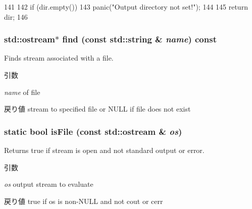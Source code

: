 \begin{DoxyCode}
141 {
142     if (dir.empty())
143         panic("Output directory not set!");
144 
145     return dir;
146 }
\end{DoxyCode}
\hypertarget{classOutputDirectory_a4b6800ca94a140ee14fcdb169be55027}{
\subsubsection[{find}]{\setlength{\rightskip}{0pt plus 5cm}std::ostream$\ast$ find (const std::string \& {\em name}) const}}
\label{classOutputDirectory_a4b6800ca94a140ee14fcdb169be55027}
Finds stream associated with a file. 
\begin{DoxyParams}{引数}
\item[{\em name}]of file \end{DoxyParams}
\begin{DoxyReturn}{戻り値}
stream to specified file or NULL if file does not exist 
\end{DoxyReturn}
\hypertarget{classOutputDirectory_acff271d62941cd7e36ece902ad929692}{
\subsubsection[{isFile}]{\setlength{\rightskip}{0pt plus 5cm}static bool isFile (const std::ostream \& {\em os})}}
\label{classOutputDirectory_acff271d62941cd7e36ece902ad929692}
Returns true if stream is open and not standard output or error. 
\begin{DoxyParams}{引数}
\item[{\em os}]output stream to evaluate \end{DoxyParams}
\begin{DoxyReturn}{戻り値}
true if os is non-\/NULL and not cout or cerr 
\end{DoxyReturn}



